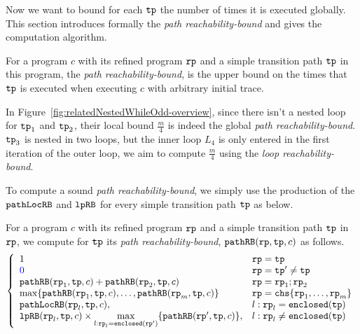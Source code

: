 Now we want to bound for each $\mathtt{tp}$ the number of times it is executed globally.
This section introduces formally the \emph{path reachability-bound} and gives the computation algorithm.

\begin{defn}
For a program $c$ with its refined program $\mathtt{rp}$ and a simple transition path $\mathtt{tp}$ in this program, 
the \emph{path reachability-bound},
is the upper bound on the
times that $\mathtt{tp}$ is executed when executing $c$ with arbitrary initial trace.
\end{defn}
%
In Figure~\ref{fig:relatedNestedWhileOdd-overview}, since there isn't a nested loop for $\mathtt{tp}_1$ and $\mathtt{tp}_2$, their local bound $\frac{m}{4}$ is indeed the global \emph{path reachability-bound}.
$\mathtt{tp}_3$ is nested in two loops, but the inner loop $L_4$ is only entered in the first iteration of the outer loop, we aim to compute $\frac{m}{4}$ using the \emph{loop reachability-bound}.

To compute a sound \emph{path reachability-bound}, we simply use the production of the $\mathtt{pathLocRB}$ and $\mathtt{lpRB}$ for every simple transition path $\mathtt{tp}$ as below.
%
\begin{defn}
 \label{def:pathrb}
 For a program $c$ with its refined program $\mathtt{rp}$ and a simple transition path $\mathtt{tp}$ in $\mathtt{rp}$, 
 we compute for $\mathtt{tp}$ its \emph{path reachability-bound}, $\mathtt{pathRB}(\mathtt{rp}, \mathtt{tp}, c)$
 as follows. 
{\small 
\[
 \left\{ 
 \begin{array}{ll}
 1 & \rprog = \tpath\\
 \highlight{0} & \rprog = \tpath' \neq \tpath\\
 \inoutB(\rprog_1, \tpath, c) + \inoutB(\rprog_2, \tpath, c) & \rprog = \rprog_1;\rprog_2 \\
 \max\left\{ \inoutB(\rprog_1, \tpath, c), \ldots, \inoutB(\rprog_m, \tpath, c) \right\} 
 & \rprog = \rpchoose{\rprog_1, \ldots, \rprog_m } \\
 \outinB(\rprog_l, \tpath, c), & l: \rprog_l = \kw{enclosed}(\tpath) \\
 \lpchB(\rprog_l, \tpath , c)
 \times \max\limits_{l:\rprog_l = \kw{enclosed}(\rprog')}
 \{\inoutB(\rprog', \tpath, c)\} , & l: \rprog_l \neq \kw{enclosed}(\tpath) \\
 \end{array}
 \right.
 \]
 }
 \end{defn}

